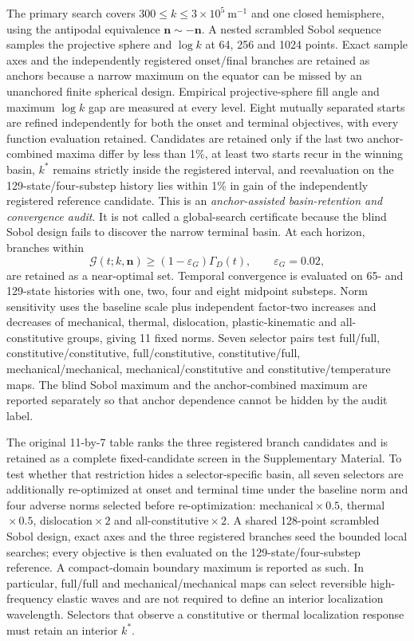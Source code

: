 The primary search covers $300\le k\le3\times10^5~\mathrm{m^{-1}}$ and one closed hemisphere, using the antipodal equivalence $\boldsymbol n\sim-\boldsymbol n$. A nested scrambled Sobol sequence samples the projective sphere and $\log k$ at 64, 256 and 1024 points. Exact sample axes and the independently registered onset/final branches are retained as anchors because a narrow maximum on the equator can be missed by an unanchored finite spherical design. Empirical projective-sphere fill angle and maximum $\log k$ gap are measured at every level. Eight mutually separated starts are refined independently for both the onset and terminal objectives, with every function evaluation retained. Candidates are retained only if the last two anchor-combined maxima differ by less than 1\%, at least two starts recur in the winning basin, $k^*$ remains strictly inside the registered interval, and reevaluation on the 129-state/four-substep history lies within 1\% in gain of the independently registered reference candidate. This is an \emph{anchor-assisted basin-retention and convergence audit}. It is not called a global-search certificate because the blind Sobol design fails to discover the narrow terminal basin. At each horizon, branches within
\begin{equation}
 \mathcal G(t;k,\boldsymbol n)\ge(1-\varepsilon_G)\Gamma_D(t),
 \qquad \varepsilon_G=0.02,
 \label{eq:ft_near_optimal_gate}
\end{equation}
are retained as a near-optimal set. Temporal convergence is evaluated on 65- and 129-state histories with one, two, four and eight midpoint substeps. Norm sensitivity uses the baseline scale plus independent factor-two increases and decreases of mechanical, thermal, dislocation, plastic-kinematic and all-constitutive groups, giving 11 fixed norms. Seven selector pairs test full/full, constitutive/constitutive, full/constitutive, constitutive/full, mechanical/mechanical, mechanical/constitutive and constitutive/temperature maps. The blind Sobol maximum and the anchor-combined maximum are reported separately so that anchor dependence cannot be hidden by the audit label.

The original 11-by-7 table ranks the three registered branch candidates and is
retained as a complete fixed-candidate screen in the Supplementary Material.
To test whether that restriction hides a selector-specific basin, all seven
selectors are additionally re-optimized at onset and terminal time under the
baseline norm and four adverse norms selected before re-optimization:
mechanical${}\times0.5$, thermal${}\times0.5$,
dislocation${}\times2$ and all-constitutive${}\times2$.  A shared 128-point
scrambled Sobol design, exact axes and the three registered branches seed the
bounded local searches; every objective is then evaluated on the
129-state/four-substep reference.  A compact-domain boundary maximum is
reported as such.  In particular, full/full and mechanical/mechanical maps can
select reversible high-frequency elastic waves and are not required to define
an interior localization wavelength.  Selectors that observe a constitutive
or thermal localization response must retain an interior $k^*$.

